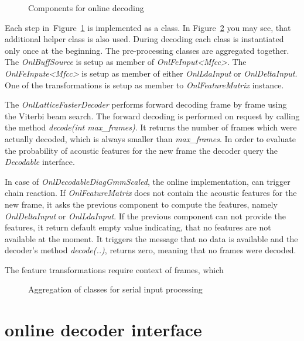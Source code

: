 \begin{figure}[!ph]
    \begin{center}
        
        \caption{Components for online decoding}
    \label{fig:online_pipeline} 
    \end{center}
\end{figure}

Each step in~Figure~\ref{fig:online_pipeline} is implemented as a class.
In Figure~\ref{fig:classes} you may see, that additional helper class is also used.
During decoding each class is instantiated only once at the beginning.
The pre-processing classes are aggregated together. 
The {\it OnlBuffSource}\/ is setup as member of {\it OnlFeInput<Mfcc>}\/.
The {\it OnlFeInpute<Mfcc>}\/ is setup as member of either {\it OnlLdaInput}\/ or {\it OnlDeltaInput}\/.
One of the transformations is setup as member to {\it OnlFeatureMatrix}\/ instance.

The {\it OnlLatticeFasterDecoder}\/ performs forward decoding frame by frame using the Viterbi beam search.
The forward decoding is performed on request by calling the method {\it decode(int max\_frames)}.
It returns the number of frames which were actually decoded, which is always smaller than {\it max\_frames}.
In order to evaluate the probability of acoustic features for the new frame
the decoder query the {\it Decodable}\/ interface.

In case of {\it OnlDecodableDiagGmmScaled}, the online implementation, can trigger chain reaction.
If {\it OnlFeatureMatrix}\/ does not contain the acoustic features for the new frame, it asks
the previous component to compute the features, namely {\it OnlDeltaInput}\/ or {\it OnlLdaInput}\/.
If the previous component can not provide the features, it return default empty value indicating,
that no features are not available at the moment. It triggers the message that no data is available
and the decoder's method {\it decode(..)}, returns zero, meaning that no frames were decoded.


The feature transformations require context of frames, which

\begin{figure}[!ph]
    \begin{center}
        
    \caption{Aggregation of classes for serial input processing}
    \label{fig:classes} 
    \end{center}
\end{figure}


\section{online decoder interface} 
\label{sec:improve}

